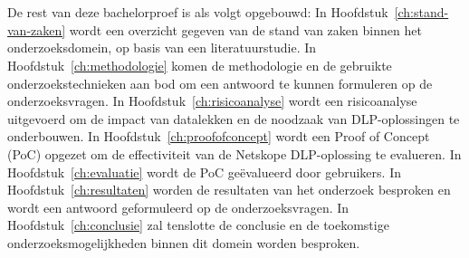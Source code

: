 \section{}%
\label{sec:opzet-bachelorproef}

De rest van deze bachelorproef is als volgt opgebouwd: 
In Hoofdstuk~\ref{ch:stand-van-zaken} wordt een overzicht gegeven van de stand van zaken binnen het onderzoeksdomein, op basis van een literatuurstudie. 
In Hoofdstuk~\ref{ch:methodologie} komen de methodologie en de gebruikte onderzoekstechnieken aan bod om een antwoord te kunnen formuleren op de onderzoeksvragen. 
In Hoofdstuk~\ref{ch:risicoanalyse} wordt een risicoanalyse uitgevoerd om de impact van datalekken en de noodzaak van DLP-oplossingen te onderbouwen. 
In Hoofdstuk~\ref{ch:proofofconcept} wordt een Proof of Concept (PoC) opgezet om de effectiviteit van de Netskope DLP-oplossing te evalueren. 
In Hoofdstuk~\ref{ch:evaluatie} wordt de PoC geëvalueerd door gebruikers. 
In Hoofdstuk~\ref{ch:resultaten} worden de resultaten van het onderzoek besproken en wordt een antwoord geformuleerd op de onderzoeksvragen. 
In Hoofdstuk~\ref{ch:conclusie} zal tenslotte de conclusie en de toekomstige onderzoeksmogelijkheden binnen dit domein worden besproken. 









